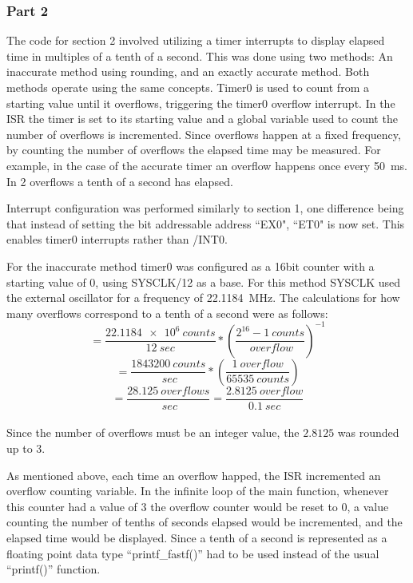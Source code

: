 \documentclass[12pt]{article}
\begin{document}
\subsubsection{Part 2}
The code for section 2 involved utilizing a timer interrupts to display elapsed time in multiples of a tenth of a second. This was done using two methods: An inaccurate method using rounding, and an exactly accurate method. Both methods operate using the same concepts. Timer0 is used to count from a starting value until it overflows, triggering the timer0 overflow interrupt. In the ISR the timer is set to its starting value and a global variable used to count the number of overflows is incremented. Since overflows happen at a fixed frequency, by counting the number of overflows the elapsed time may be measured. For example, in the case of the accurate timer an overflow happens once every \SI{50}{ms}. In 2 overflows a tenth of a second has elapsed. 

Interrupt configuration was performed similarly to section 1, one difference being that instead of setting the bit addressable address ``EX0", ``ET0" is now set. This enables timer0 interrupts rather than /INT0. 

For the inaccurate method timer0 was configured as a 16bit counter with a starting value of 0, using SYSCLK/12 as a base. For this method SYSCLK used the external oscillator for a frequency of \SI{22.1184}{MHz}. The calculations for how many overflows correspond to a tenth of a second were as follows:\\
\begin{equation}
	= \frac{\SI{22.1184e6}{counts}}{\SI{12}{sec}}*{\left(\frac{2^{16}- \SI{1}{counts}}{\SI{}{overflow}}\right)}^{-1}
\end{equation}
\begin{equation}
	= \frac{\SI{1843200}{counts}}{\SI{}{sec}}*\left(\frac{\SI{1}{overflow}}{\SI{65535}{counts}}\right)
\end{equation}
\begin{equation}
	= \frac{\SI{28.125}{overflows}}{\SI{}{sec}} = \frac{\SI{2.8125}{overflow}}{\SI{0.1}{sec}}
\end{equation}\\
Since the number of overflows must be an integer value, the $2.8125$ was rounded up to $3$.

As mentioned above, each time an overflow happed, the ISR incremented an overflow counting variable. In the infinite loop of the main function, whenever this counter had a value of $3$ the overflow counter would be reset to 0, a value counting the number of tenths of seconds elapsed would be incremented, and the elapsed time would be displayed. Since a tenth of a second is represented as a floating point data type ``printf\_fastf()'' had to be used instead of the usual ``printf()'' function.
\end{document}
